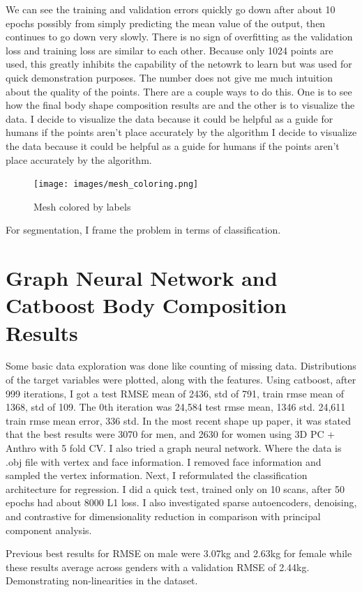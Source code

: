 We can see the training and validation errors quickly go down after about 10 epochs possibly from simply predicting the mean value of the output, then continues to go down very slowly. There is no sign of overfitting as the validation loss and training loss are similar to each other. Because only 1024 points are used, this greatly inhibits the capability of the netowrk to learn but was used for quick demonstration purposes. The number does not give me much intuition about the quality of the points. There are a couple ways to do this. One is to see how the final body shape composition results are and the other is to visualize the data. I decide to visualize the data because it could be helpful as a guide for humans if the points aren't place accurately by the algorithm  I decide to visualize the data because it could be helpful as a guide for humans if the points aren't place accurately by the algorithm. 

\begin{figure}[!htb]
	\caption{Mesh colored by labels}
	\centering
	\texttt{[image: images/mesh\_coloring.png]}
\end{figure}

For segmentation, I frame the problem in terms of classification.

\section{Graph Neural Network and Catboost Body Composition Results}

Some basic data exploration was done like counting of missing data. Distributions of the target variables were plotted, along with the features. Using catboost, after 999 iterations, I got a test RMSE mean of 2436, std of 791, train rmse mean of 1368, std of 109. The 0th iteration was 24,584 test rmse mean, 1346 std. 24,611 train rmse mean error, 336 std. In the most recent shape up paper, it was stated that the best results were 3070 for men, and 2630 for women using 3D PC + Anthro with 5 fold CV. I also tried a graph neural network. Where the data is .obj file with vertex and face information. I removed face information and sampled the vertex information. Next, I reformulated the classification architecture for regression. I did a quick test, trained only on 10 scans, after 50 epochs had about 8000 L1 loss. I also investigated sparse autoencoders, denoising, and contrastive for dimensionality reduction in comparison with principal component analysis.

Previous best results for RMSE on male were 3.07kg and 2.63kg for female while these results average across genders with a validation RMSE of 2.44kg. Demonstrating non-linearities in the dataset.

